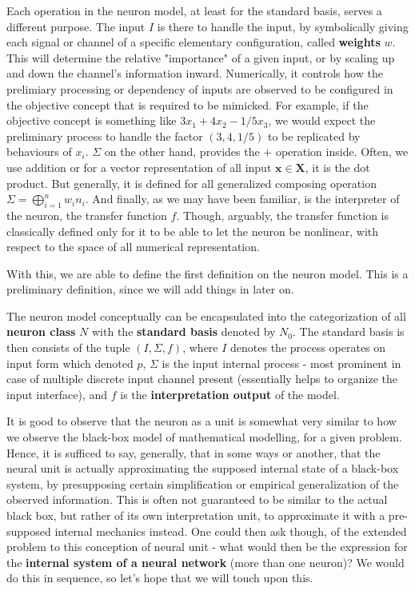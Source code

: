 Each operation in the neuron model, at least for the standard basis, serves a different purpose. The input $I$ is there to handle the input, by symbolically giving each signal or channel of a specific elementary configuration, called \textbf{weights} $w$. This will determine the relative "importance" of a given input, or by scaling up and down the channel's information inward. Numerically, it controls how the prelimiary processing or dependency of inputs are observed to be configured in the objective concept that is required to be mimicked. For example, if the objective concept is something like $3x_1 + 4x_2 - 1/5 x_3$, we would expect the preliminary process to handle the factor $(3,4,1/5)$ to be replicated by behaviours of $x_i$. $\Sigma$ on the other hand, provides the $+$ operation inside. Often, we use addition or for a vector representation of all input $\mathbf{x}\in \mathbf{X}$, it is the dot product. But generally, it is defined for all generalized composing operation $\Sigma= \bigoplus_{i=1}^{n}w_i n_i$. And finally, as we may have been familiar, is the interpreter of the neuron, the transfer function $f$. Though, arguably, the transfer function is classically defined only for it to be able to let the neuron be nonlinear, with respect to the space of all numerical representation. 

With this, we are able to define the first definition on the neuron model. This is a preliminary definition, since we will add things in later on.

\begin{definition}
    The neuron model conceptually can be encapsulated into the categorization of all \textbf{neuron class} $N$ with the \textbf{standard basis} denoted by $N_{0}$. The standard basis is then consists of the tuple $(I,\Sigma, f)$, where $I$ denotes the process operates on input form which denoted $p$, $\Sigma$ is the input internal process - most prominent in case of multiple discrete input channel present (essentially helps to organize the input interface), and $f$ is the \textbf{interpretation output} of the model. 
\end{definition}

It is good to observe that the neuron as a unit is somewhat very similar to how we observe the black-box model of mathematical modelling, for a given problem. Hence, it is sufficed to say, generally, that in some ways or another, that the neural unit is actually approximating the supposed internal state of a black-box system, by presupposing certain simplification or empirical generalization of the observed information. This is often not guaranteed to be similar to the actual black box, but rather of its own interpretation unit, to approximate it with a pre-supposed internal mechanics instead. One could then ask though, of the extended problem to this conception of neural unit - what would then be the expression for the \textbf{internal system of a neural network} (more than one neuron)? We would do this in sequence, so let's hope that we will touch upon this. 


